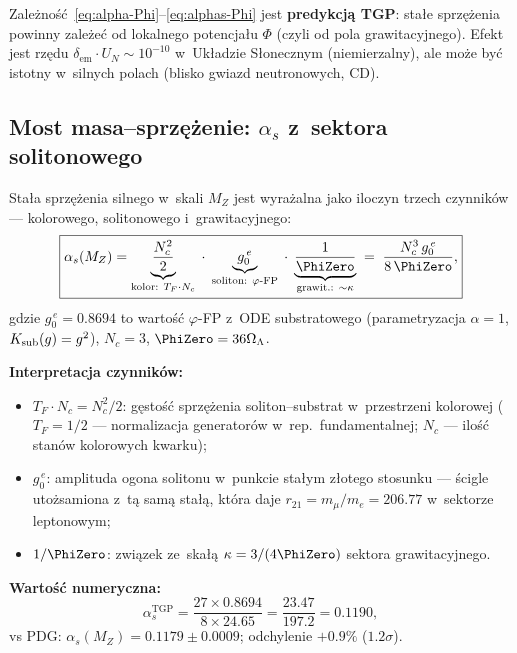 \begin{remark}[Testowalność]\label{rem:coupling-test}
Zależność~\eqref{eq:alpha-Phi}--\eqref{eq:alphas-Phi} jest
\textbf{predykcją TGP}: stałe sprzężenia powinny zależeć od
lokalnego potencjału $\Phi$ (czyli od pola grawitacyjnego).
Efekt jest rzędu $\delta_{\mathrm{em}} \cdot U_N \sim 10^{-10}$
w~Układzie Słonecznym (niemierzalny), ale może być istotny
w~silnych polach (blisko gwiazd neutronowych, CD).
\end{remark}

\subsection{Most masa--sprz\k{e}\.zenie: $\alpha_s$ z~sektora solitonowego}%
\label{ssec:alphas-soliton-bridge}

\begin{proposition}%
\label{prop:alphas-phiFP}
Sta\l{}a sprz\k{e}\.zenia silnego w~skali $M_Z$ jest wyra\.zalna
jako iloczyn trzech czynnik\'ow --- kolorowego, solitonowego
i~grawitacyjnego:
\begin{equation}\label{eq:alphas-formula}
  \boxed{\alpha_s(M_Z)
    = \underbrace{\frac{N_c^2}{2}}_{\text{kolor: } T_F \cdot N_c}
    \;\cdot\;
    \underbrace{g_0^{\,e}}_{\text{soliton: }\varphi\text{-FP}}
    \;\cdot\;
    \underbrace{\frac{1}{\PhiZero}}_{\text{grawit.: }\sim\kappa}
    \;=\; \frac{N_c^3\,g_0^{\,e}}{8\,\PhiZero},}
\end{equation}
gdzie $g_0^{\,e} = 0.8694$ to warto\'s\'c $\varphi$-FP
z~ODE substratowego (parametryzacja $\alpha = 1$,
$K_{\rm sub}(g) = g^2$), $N_c = 3$, $\PhiZero = 36\Omega_\Lambda$.

\textbf{Interpretacja czynnik\'ow:}
\begin{itemize}[nosep]
  \item $T_F \cdot N_c = N_c^2/2$: g\k{e}sto\'s\'c sprz\k{e}\.zenia
    soliton--substrat w~przestrzeni kolorowej
    ($T_F = 1/2$ --- normalizacja generator\'ow w~rep.\ fundamentalnej;
    $N_c$ --- ilo\'s\'c stan\'ow kolorowych kwarku);
  \item $g_0^{\,e}$: amplituda ogona solitonu w~punkcie sta\l{}ym
    z\l{}otego stosunku --- \'scigle uto\.zsamiona z~t\k{a} sam\k{a}
    sta\l{}\k{a}, kt\'ora daje $r_{21} = m_\mu/m_e = 206.77$
    w~sektorze leptonowym;
  \item $1/\PhiZero$: zwi\k{a}zek ze~ska\l{}\k{a} $\kappa = 3/(4\PhiZero)$
    sektora grawitacyjnego.
\end{itemize}

\textbf{Warto\'s\'c numeryczna:}
\begin{equation}
  \alpha_s^{\mathrm{TGP}} = \frac{27 \times 0.8694}{8 \times 24.65}
  = \frac{23.47}{197.2} = 0.1190,
\end{equation}
vs PDG: $\alpha_s(M_Z) = 0.1179 \pm 0.0009$;
odchylenie $+0.9\%$ ($1.2\sigma$).
\end{proposition}

